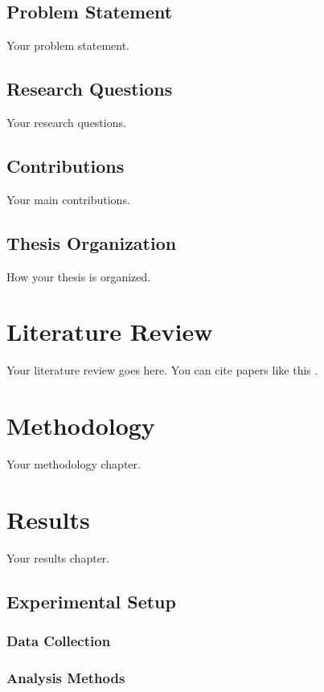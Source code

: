 \documentclass[12pt,a4paper]{report}
\begin{document}
\section{Problem Statement}
Your problem statement.

\section{Research Questions}
Your research questions.

\section{Contributions}
Your main contributions.

\section{Thesis Organization}
How your thesis is organized.

\chapter{Literature Review}
\label{ch:literature-review}

Your literature review goes here. You can cite papers like this \cite{example2023}.

\chapter{Methodology}
\label{ch:methodology}

Your methodology chapter.

\chapter{Results}
\label{ch:results}

Your results chapter.

\section{Experimental Setup}
\subsection{Data Collection}
\subsection{Analysis Methods}
\end{document}
